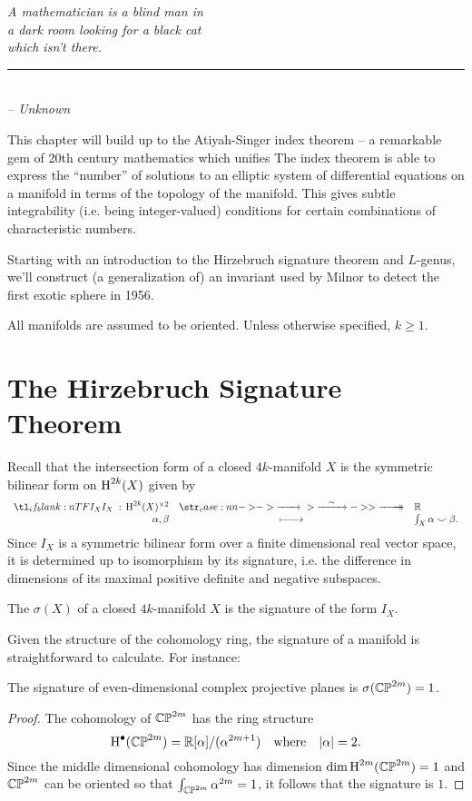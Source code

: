 \begin{flushleft}
	\textsl{A mathematician is a blind man in }\\
	\textsl{a dark room looking for a black cat}\\
	\textsl{which isn’t there.}\\
	\rule[0pt]{15em}{0.5pt}\\
	\textsl{-- Unknown}
	\vspace{2em}
\end{flushleft}

This chapter will build up to the Atiyah-Singer index theorem -- a remarkable gem of 20th century mathematics which unifies 
The index theorem is able to express the ``number'' of solutions to an elliptic system of differential equations on a manifold in terms of the topology of the manifold. This gives subtle integrability (i.e. being integer-valued) conditions for certain combinations of characteristic numbers.

Starting with an introduction to the Hirzebruch signature theorem and $L$-genus, we'll construct (a generalization of) an invariant used by Milnor to detect the first exotic sphere \cite{milnor1956manifolds} in 1956.

\begin{convention*}
	All manifolds are assumed to be oriented. Unless otherwise specified, $k\geq 1$.
\end{convention*}

\section{The Hirzebruch Signature Theorem}\label{sec:hirzebruch-signature-theorem}

Recall that the intersection form of a closed $4k$-manifold $X$ is the symmetric bilinear form on $\operatorname{H}^{2k}(X)$ given by
\[
	\lkxfunc{I_X}{\H^{2k}(X)^{\times 2}}{\R}{\alpha,\beta}{\int_X \alpha\smile \beta.}
\]
Since $I_X$ is a symmetric bilinear form over a finite dimensional real vector space, it is determined up to isomorphism by its signature, i.e. the difference in dimensions of its maximal positive definite and negative subspaces. 

\begin{definition}
	The  $\sigma(X)$ of a closed $4k$-manifold $X$ is the signature of the form $I_X$.
\end{definition}

Given the structure of the cohomology ring, the signature of a manifold is straightforward to calculate. For instance:
\begin{proposition}
	The signature of even-dimensional complex projective planes is $\sigma(\mathbb{CP}^{2m})=1$.
\end{proposition}
\begin{proof}
	The cohomology of $\mathbb{CP}^{2m}$ has the ring structure
	\[
		\operatorname{H}^\bullet(\mathbb{CP}^{2m}) = \mathbb{R}[\alpha]/(\alpha^{2m+1})\quad\textrm{where}\quad |\alpha|=2.
	\]
	Since the middle dimensional cohomology has dimension $\dim \operatorname{H}^{2m}(\mathbb{CP}^{2m}) = 1$ and $\mathbb{CP}^{2m}$ can be oriented so that $\int_{\mathbb{CP}^{2m}} \alpha^{2m} = 1$, it follows that the signature is $1$.
\end{proof}

